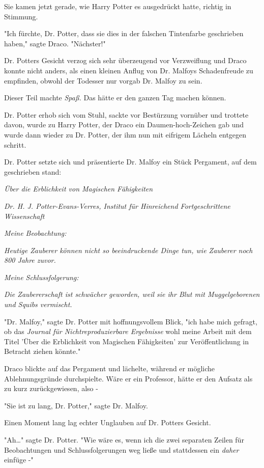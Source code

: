 {Sie kamen jetzt gerade, wie Harry Potter es ausgedrückt hatte, richtig in Stimmung.

"Ich fürchte, Dr. Potter, dass sie dies in der falschen Tintenfarbe geschrieben haben," sagte Draco. "Nächster!"

Dr. Potters Gesicht verzog sich sehr überzeugend vor Verzweiflung und Draco konnte nicht anders, als einen kleinen Anflug von Dr. Malfoys Schadenfreude zu empfinden, obwohl der Todesser nur vorgab Dr. Malfoy zu sein.

Dieser Teil machte \emph{Spaß.} Das hätte er den ganzen Tag machen können.

Dr. Potter erhob sich vom Stuhl, sackte vor Bestürzung vornüber und trottete davon, wurde zu Harry Potter, der Draco ein Daumen-hoch-Zeichen gab und wurde dann wieder zu Dr. Potter, der ihm nun mit eifrigem Lächeln entgegen schritt.

Dr. Potter setzte sich und präsentierte Dr. Malfoy ein Stück Pergament, auf dem geschrieben stand:

\emph{Über die Erblichkeit von Magischen Fähigkeiten}

\emph{Dr. H. J. Potter-Evans-Verres, Institut für Hinreichend Fortgeschrittene Wissenschaft}

\emph{Meine Beobachtung:}

\emph{Heutige Zauberer können nicht so beeindruckende Dinge tun, wie Zauberer noch 800 Jahre zuvor.}

\emph{Meine Schlussfolgerung:}

\emph{Die Zaubererschaft ist schwächer geworden, weil sie ihr Blut mit Muggelgeborenen und Squibs vermischt.}

"Dr. Malfoy," sagte Dr. Potter mit hoffnungsvollem Blick, "ich habe mich gefragt, ob das \emph{Journal für Nichtreproduzierbare Ergebnisse} wohl meine Arbeit mit dem Titel 'Über die Erblichkeit von Magischen Fähigkeiten' zur Veröffentlichung in Betracht ziehen könnte."

Draco blickte auf das Pergament und lächelte, während er mögliche Ablehnungsgründe durchspielte. Wäre er ein Professor, hätte er den Aufsatz als zu kurz zurückgewiesen, also -

"Sie ist zu lang, Dr. Potter," sagte Dr. Malfoy.

Einen Moment lang lag echter Unglauben auf Dr. Potters Gesicht.

"Ah…" sagte Dr. Potter. "Wie wäre es, wenn ich die zwei separaten Zeilen für Beobachtungen und Schlussfolgerungen weg ließe und stattdessen ein \emph{daher} einfüge -"

}
